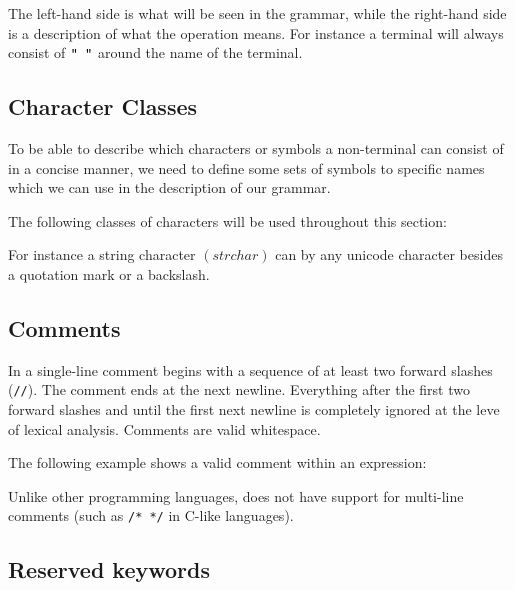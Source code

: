 The left-hand side is what will be seen in the grammar, while the right-hand
side is a description of what the operation means. For instance  a terminal will
always consist of $\texttt{" "}$ around the name of the terminal.

\subsection{Character Classes}
To be able to describe which characters or symbols a non-terminal can consist of
in a concise manner, we need to define some sets of symbols to specific names
which we can use in the description of our grammar.

The following classes of characters will be used throughout this section:

\begin{ebnf}
\end{ebnf}

For instance a string character $\left(strchar\right)$ can by any
unicode character besides a quotation mark or a backslash. 

\subsection{Comments}
\label{sec:comments}
In \productname{} a single-line comment begins with a sequence of at least two
forward slashes (\texttt{//}). The comment ends at the next newline. Everything
after the first two forward slashes and until the first next newline is
completely ignored at the leve of lexical analysis. Comments are valid
whitespace.

The following example shows a valid comment within an expression:


Unlike other programming languages, \productname{} does not have support for
multi-line comments (such as \texttt{/* */} in C-like languages).

\subsection{Reserved keywords}

